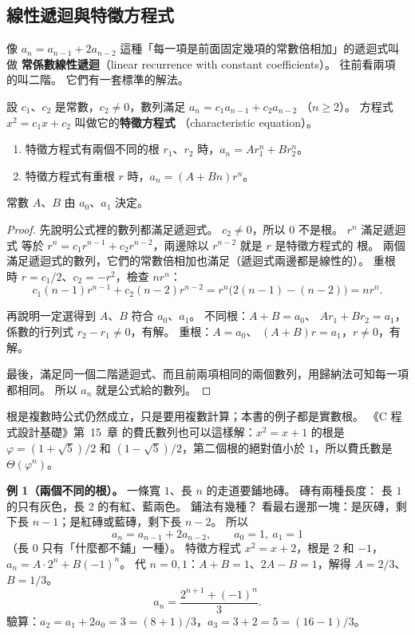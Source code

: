 \subsection{線性遞迴與特徵方程式}

像 $a_n = a_{n-1} + 2a_{n-2}$ 這種「每一項是前面固定幾項的常數倍相加」的遞迴式叫做
\textbf{常係數線性遞迴}（linear recurrence with constant coefficients）。 往前看兩項
的叫二階。 它們有一套標準的解法。

\begin{theorem}[二階齊次線性遞迴]
\label{thm:rec-linear}
設 $c_1$、$c_2$ 是常數，$c_2 \ne 0$，數列滿足 $a_n = c_1 a_{n-1} + c_2 a_{n-2}$
（$n \ge 2$）。 方程式 $x^2 = c_1 x + c_2$ 叫做它的\textbf{特徵方程式}
（characteristic equation）。
\begin{enumerate}
\item 特徵方程式有兩個不同的根 $r_1$、$r_2$ 時，$a_n = A r_1^n + B r_2^n$。
\item 特徵方程式有重根 $r$ 時，$a_n = (A + Bn) r^n$。
\end{enumerate}
常數 $A$、$B$ 由 $a_0$、$a_1$ 決定。
\end{theorem}

\begin{proof}
先說明公式裡的數列都滿足遞迴式。 $c_2 \ne 0$，所以 $0$ 不是根。 $r^n$ 滿足遞迴式
等於 $r^n = c_1 r^{n-1} + c_2 r^{n-2}$，兩邊除以 $r^{n-2}$ 就是 $r$ 是特徵方程式的
根。 兩個滿足遞迴式的數列，它們的常數倍相加也滿足（遞迴式兩邊都是線性的）。 重根
時 $r = c_1/2$、$c_2 = -r^2$，檢查 $n r^n$：
\[
c_1 (n-1) r^{n-1} + c_2 (n-2) r^{n-2} = r^{n}\bigl(2(n-1) - (n-2)\bigr) = n r^n .
\]

再說明一定選得到 $A$、$B$ 符合 $a_0$、$a_1$。 不同根：$A + B = a_0$、
$A r_1 + B r_2 = a_1$，係數的行列式 $r_2 - r_1 \ne 0$，有解。 重根：$A = a_0$、
$(A + B) r = a_1$，$r \ne 0$，有解。

最後，滿足同一個二階遞迴式、而且前兩項相同的兩個數列，用歸納法可知每一項都相同。
所以 $a_n$ 就是公式給的數列。
\end{proof}

根是複數時公式仍然成立，只是要用複數計算；本書的例子都是實數根。 《C 程式設計基礎》第~15~章
的費氏數列也可以這樣解：$x^2 = x + 1$ 的根是 $\varphi = (1 + \sqrt{5})/2$ 和
$(1 - \sqrt{5})/2$，第二個根的絕對值小於 $1$，所以費氏數是
$\Theta(\varphi^n)$。

\textbf{例 1（兩個不同的根）。} 一條寬 $1$、長 $n$ 的走道要鋪地磚。 磚有兩種長度：
長 $1$ 的只有灰色，長 $2$ 的有紅、藍兩色。 鋪法有幾種？ 看最右邊那一塊：是灰磚，剩
下長 $n - 1$；是紅磚或藍磚，剩下長 $n - 2$。 所以
\[
a_n = a_{n-1} + 2a_{n-2}, \qquad a_0 = 1,\ a_1 = 1
\]
（長 $0$ 只有「什麼都不鋪」一種）。 特徵方程式 $x^2 = x + 2$，根是 $2$ 和 $-1$，
$a_n = A \cdot 2^n + B(-1)^n$。 代 $n = 0, 1$：$A + B = 1$、$2A - B = 1$，解得
$A = 2/3$、$B = 1/3$。
\[
a_n = \frac{2^{n+1} + (-1)^n}{3}.
\]
驗算：$a_2 = a_1 + 2a_0 = 3 = (8 + 1)/3$，$a_3 = 3 + 2 = 5 = (16 - 1)/3$。

